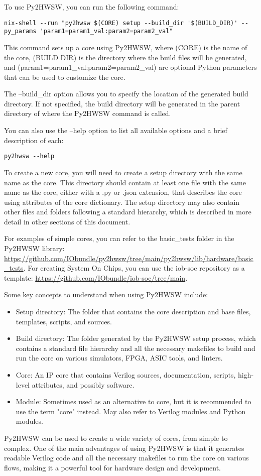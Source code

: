 %

To use Py2HWSW, you can run the following command:
\begin{verbatim}
nix-shell --run "py2hwsw $(CORE) setup --build_dir '$(BUILD_DIR)' --py_params 'param1=param1_val:param2=param2_val"
\end{verbatim}
This command sets up a core using Py2HWSW, where (CORE) is the name of the core, (BUILD DIR) is the directory where the build files will be generated, and (param1=param1\_val:param2=param2\_val) are optional Python parameters that can be used to customize the core.

The --build\_dir option allows you to specify the location of the generated build directory. If not specified, the build directory will be generated in the parent directory of where the Py2HWSW command is called.

You can also use the --help option to list all available options and a brief description of each:
\begin{verbatim}
py2hwsw --help
\end{verbatim}

To create a new core, you will need to create a setup directory with the same name as the core. This directory should contain at least one file with the same name as the core, either with a .py or .json extension, that describes the core using attributes of the core dictionary. The setup directory may also contain other files and folders following a standard hierarchy, which is described in more detail in other sections of this document.

For examples of simple cores, you can refer to the basic\_tests folder in the Py2HWSW library: \url{https://github.com/IObundle/py2hwsw/tree/main/py2hwsw/lib/hardware/basic_tests}. For creating System On Chips, you can use the iob-soc repository as a template: \url{https://github.com/IObundle/iob-soc/tree/main}.

Some key concepts to understand when using Py2HWSW include:

\begin{itemize}
  \item Setup directory: The folder that contains the core description and base files, templates, scripts, and sources.
  \item Build directory: The folder generated by the Py2HWSW setup process, which contains a standard file hierarchy and all the necessary makefiles to build and run the core on various simulators, FPGA, ASIC tools, and linters.
  \item Core: An IP core that contains Verilog sources, documentation, scripts, high-level attributes, and possibly software.
  \item Module: Sometimes used as an alternative to core, but it is recommended to use the term "core" instead. May also refer to Verilog modules and Python modules.
\end{itemize}

Py2HWSW can be used to create a wide variety of cores, from simple to complex. One of the main advantages of using Py2HWSW is that it generates readable Verilog code and all the necessary makefiles to run the core on various flows, making it a powerful tool for hardware design and development.
